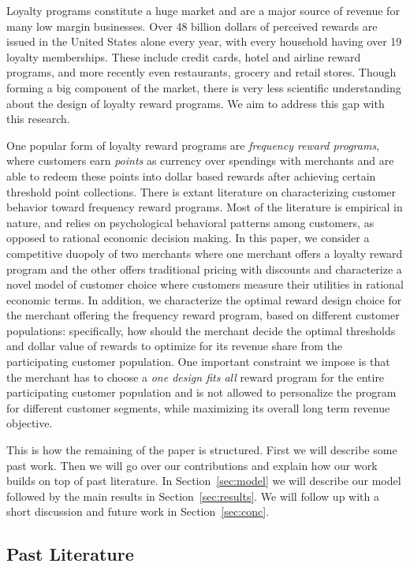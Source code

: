 Loyalty programs constitute a huge market and are a major source of revenue for many low margin businesses.
Over 48 billion dollars of perceived rewards are issued in the United States alone every year, with every household having over 19 loyalty memberships.
These include credit cards, hotel and airline reward programs, and more recently even restaurants, grocery and retail stores.
Though forming a big component of the market, there is very less scientific understanding about the design of loyalty reward programs. We aim to address this gap with this research.

One popular form of loyalty reward programs are \emph{frequency reward programs}, where customers earn \emph{points} as currency over spendings with merchants and are able to redeem these points into dollar based rewards after achieving certain threshold point collections.
There is extant literature on characterizing customer behavior toward frequency reward programs.
Most of the literature is empirical in nature, and relies on psychological behavioral patterns among customers, as opposed to rational economic decision making.
In this paper, we consider a competitive duopoly of two merchants where one merchant offers a loyalty reward program and the other offers traditional pricing with discounts and characterize a novel model of customer choice where customers measure their utilities in rational economic terms.
In addition, we characterize the optimal reward design choice for the merchant offering the frequency reward program, based on different customer populations: specifically, how should the merchant decide the optimal thresholds and dollar value of rewards to optimize for its revenue share from the participating customer population.
One important constraint we impose is that the merchant has to choose a \emph{one design fits all} reward program for the entire participating customer population and is not allowed to personalize the program for different customer segments, while maximizing its overall long term revenue objective.

This is how the remaining of the paper is structured. First we will describe some past work. Then we will go over our contributions and explain how our work builds on top of past literature. In Section~\ref{sec:model} we will describe our model followed by the main results in Section~\ref{sec:results}. We will follow up with a short discussion and future work in Section~\ref{sec:conc}.

\subsection{Past Literature}

